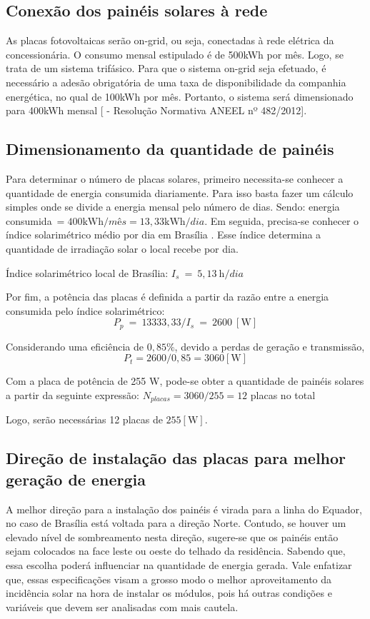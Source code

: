 \subsection{Conexão dos painéis solares à rede}

	As placas fotovoltaicas serão on-grid, ou seja, conectadas à rede elétrica da concessionária. O consumo mensal estipulado é de 500kWh por mês. Logo, se trata de um sistema trifásico. Para que o sistema on-grid seja efetuado, é necessário a adesão obrigatória de uma taxa de disponibilidade da companhia energética, no qual de 100kWh por mês. Portanto, o sistema será dimensionado para 400kWh mensal [\cite{2013Aneel} -  Resolução Normativa ANEEL nº 482/2012].

\subsection{Dimensionamento da quantidade de painéis}

	Para determinar o número de placas solares, primeiro necessita-se conhecer a quantidade de energia consumida diariamente. Para isso basta fazer um cálculo simples onde se divide a energia mensal pelo número de dias. Sendo: energia consumida$\ = 400 \si{\kilo\watt\hour}/mês = 13,33 \si{\kilo\watt\hour}/dia$. Em seguida, precisa-se conhecer o índice solarimétrico médio por dia em Brasília \cite{2000UFPE}. Esse índice determina a quantidade de irradiação solar o local recebe por dia.

	Índice solarimétrico local de Brasília: $I_s\ =\ 5,13\ \si{\hour}/dia$

	Por fim, a potência das placas é definida a partir da razão entre a energia consumida pelo índice solarimétrico:$$P_p\ =\ 13333,33/I_s\ =\ 2600\ [\si{\watt}]$$

	Considerando uma eficiência de $0,85\%$, devido a perdas de geração e transmissão, $$P_t = 2600/0,85 = 3060 [\si{\watt}]$$

	Com a placa de potência de 255 W, pode-se obter a quantidade de painéis solares a partir da seguinte expressão: $N_{placas} = 3060/255 = 12$ placas no total

	Logo, serão necessárias 12 placas de $255 [\si{\watt}]$.

\subsection{Direção de instalação das placas para melhor geração de energia}

	A melhor direção para a instalação dos painéis é virada para a linha do Equador, no caso de Brasília está voltada para a direção Norte. Contudo, se houver um elevado nível de sombreamento nesta direção, sugere-se que os painéis então sejam colocados na face leste ou oeste do telhado da residência. Sabendo que, essa escolha poderá influenciar na quantidade de energia gerada. Vale enfatizar que, essas especificações visam a grosso modo o melhor aproveitamento da incidência solar na hora de instalar os módulos, pois há outras condições e variáveis que devem ser analisadas com mais cautela.

